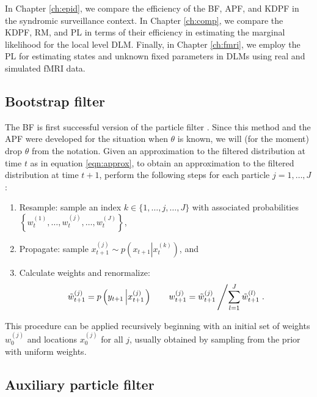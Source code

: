 In Chapter \ref{ch:epid}, we compare the efficiency of the BF, APF, and KDPF in the syndromic surveillance context. In Chapter \ref{ch:comp}, we compare the KDPF, RM, and PL in terms of their efficiency in estimating the marginal likelihood for the local level DLM. Finally, in Chapter \ref{ch:fmri}, we employ the PL for estimating states and unknown fixed parameters in DLMs using real and simulated fMRI data.

\subsection{Bootstrap filter \label{sec:bf}}

The BF is first successful version of the particle filter \citep{Gord:Salm:Smit:nove:1993,Kita:mont:1996}. Since this method and the APF were developed for the situation when $\theta$ is known, we will (for the moment) drop $\theta$ from the notation. Given an approximation to the filtered distribution at time $t$ as in equation \eqref{eqn:approx}, to obtain an approximation to the filtered distribution at time $t+1$, perform the following steps for each particle $j=1,\ldots,J$:
\begin{enumerate}
\item Resample: sample an index $k\in\{1,\ldots,j,\ldots,J\}$ with associated probabilities $\left\{w_t^{(1)},\ldots,w_t^{(j)},\ldots,w_t^{(J)}\right\}$,
\item Propagate: sample $x_{t+1}^{(j)} \sim p\left( x_{t+1}\left|x_t^{(k)}\right.\right)$, and
\item Calculate weights and renormalize:
\[ \tilde{w}_{t+1}^{(j)} = p\left(y_{t+1}\left|x_{t+1}^{(j)}\right.\right) \qquad w_{t+1}^{(j)} = \tilde{w}_{t+1}^{(j)}\left/ \sum_{l=1}^J \tilde{w}_{t+1}^{(l)} \right. .\]
\end{enumerate}
This procedure can be applied recursively beginning with an initial set of weights $w_0^{(j)}$ and locations $x_0^{(j)}$ for all $j$, usually obtained by sampling from the prior with uniform weights.

\subsection{Auxiliary particle filter \label{sec:apf}}

